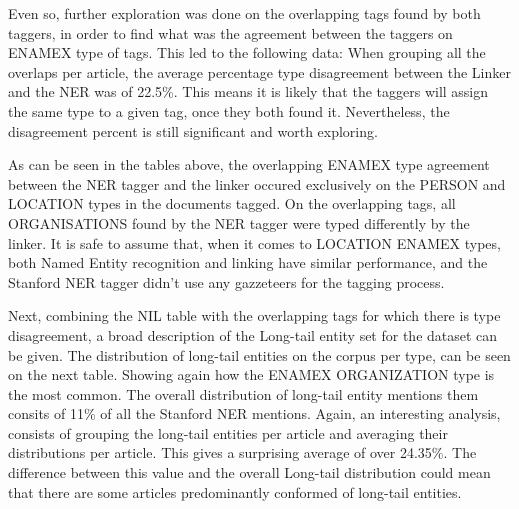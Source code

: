 Even so, further exploration was done on the overlapping tags found by both taggers,
in order to find what was the agreement between the taggers on ENAMEX type of tags. 
This led to the following data:
When grouping all the overlaps per article, the average percentage type disagreement between the Linker and the NER was of 22.5\%.
This means it is likely that the taggers will assign the same type to a given tag, once they both found it.
Nevertheless, the disagreement percent is still significant and worth exploring.

As can be seen in the tables above, the overlapping ENAMEX type agreement between the NER tagger and the linker occured exclusively on
the PERSON and LOCATION types in the documents tagged.
On the overlapping tags, all ORGANISATIONS found by the NER tagger were typed differently by the linker.
It is safe to assume that, when it comes to LOCATION ENAMEX types, both Named Entity recognition and linking have similar performance,
and the Stanford NER tagger didn't use any gazzeteers\cite{stanfordfaq} for the tagging process.

Next, combining the NIL table with the overlapping tags for which there is type disagreement, a broad description of the Long-tail entity set for the dataset can be given.
The distribution of long-tail entities on the corpus per type, can be seen on the next table.
Showing again how the ENAMEX ORGANIZATION type is the most common.
The overall distribution of long-tail entity mentions them consits of 11\% of all the Stanford NER mentions.
Again, an interesting analysis, consists of grouping the long-tail entities per article and averaging their distributions per article.
This gives a surprising average of over 24.35\%.
The difference between this value and the overall Long-tail distribution could mean that there are some articles predominantly conformed of long-tail entities.

